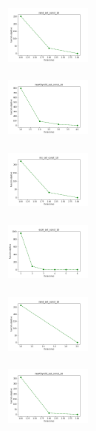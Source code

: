 \begin{figure}[H]
\begin{subfigure}
        \centering
        \includegraphics[width=0.234\textwidth]{img/copkm2/rand_set_const_10_277451237_cost.png}
    \end{subfigure}
    \hfill
    \begin{subfigure}
        \centering
        \includegraphics[width=0.234\textwidth]{img/copkm2/newthyroid_set_const_10_277451237_cost.png}
    \end{subfigure}
    \hfill
    \begin{subfigure}
        \centering
        \includegraphics[width=0.234\textwidth]{img/copkm2/iris_set_const_10_49258669_cost.png}
    \end{subfigure}
    \hfill
    \begin{subfigure}
        \centering
        \includegraphics[width=0.234\textwidth]{img/copkm2/ecoli_set_const_10_49258669_cost.png}
    \end{subfigure}
    \hfill
    \begin{subfigure}
        \centering
        \includegraphics[width=0.234\textwidth]{img/copkm2/rand_set_const_10_49258669_cost.png}
    \end{subfigure}
    \hfill
    \begin{subfigure}
        \centering
        \includegraphics[width=0.234\textwidth]{img/copkm2/newthyroid_set_const_10_49258669_cost.png}

\end{subfigure}
\end{figure}
